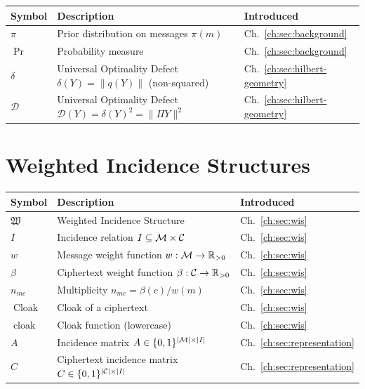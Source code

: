 \begin{center}
\begin{tabular}{lll}
\hline
\textbf{Symbol} & \textbf{Description} & \textbf{Introduced} \\
\hline
  $\pi$ & Prior distribution on messages $\pi(m)$ & Ch.~\ref{ch:sec:background} \\
  $\Pr$ & Probability measure & Ch.~\ref{ch:sec:background} \\
  $\delta$ & Universal Optimality Defect $\delta(Y)=\|q(Y)\|$ (non-squared) & Ch.~\ref{ch:sec:hilbert-geometry} \\
  $\mathcal D$ & Universal Optimality Defect $\mathcal D(Y)=\delta(Y)^2=\|\Pi Y\|^2$ & Ch.~\ref{ch:sec:hilbert-geometry} \\
\hline
\end{tabular}
\end{center}

\section*{Weighted Incidence Structures}

\begin{center}
\begin{tabular}{lll}
\hline
\textbf{Symbol} & \textbf{Description} & \textbf{Introduced} \\
\hline
  $\mathfrak W$ & Weighted Incidence Structure & Ch.~\ref{ch:sec:wis} \\
  $I$ & Incidence relation $I\subseteq\mathcal{M}\times\mathcal{C}$ & Ch.~\ref{ch:sec:wis} \\
  $w$ & Message weight function $w:\mathcal{M}\to\mathbb R_{>0}$ & Ch.~\ref{ch:sec:wis} \\
  $\beta$ & Ciphertext weight function $\beta:\mathcal{C}\to\mathbb R_{>0}$ & Ch.~\ref{ch:sec:wis} \\
  $n_{mc}$ & Multiplicity $n_{mc}=\beta(c)/w(m)$ & Ch.~\ref{ch:sec:wis} \\
  $\operatorname{Cloak}$ & Cloak of a ciphertext & Ch.~\ref{ch:sec:wis} \\
  $\operatorname{cloak}$ & Cloak function (lowercase) & Ch.~\ref{ch:sec:wis} \\
  $A$ & Incidence matrix $A\in\{0,1\}^{|\mathcal{M}|\times|I|}$ & Ch.~\ref{ch:sec:representation} \\
  $C$ & Ciphertext incidence matrix $C\in\{0,1\}^{|\mathcal{C}|\times|I|}$ & Ch.~\ref{ch:sec:representation} \\
\hline
\end{tabular}
\end{center}

